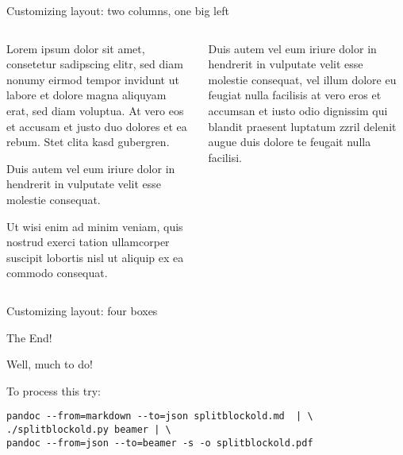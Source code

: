 \documentclass[10pt,english,ignorenonframetext,]{beamer}
\begin{document}
\begin{frame}{Customizing layout: two columns, one big left}

\vspace*{-1em}\begin{columns}[T]
	\begin{column}[t]{0.66\textwidth}

Lorem ipsum dolor sit amet, consetetur sadipscing elitr, sed diam nonumy
eirmod tempor invidunt ut labore et dolore magna aliquyam erat, sed diam
voluptua. At vero eos et accusam et justo duo dolores et ea rebum. Stet
clita kasd gubergren.

Duis autem vel eum iriure dolor in hendrerit in vulputate velit esse
molestie consequat.

Ut wisi enim ad minim veniam, quis nostrud exerci tation ullamcorper
suscipit lobortis nisl ut aliquip ex ea commodo consequat.

	\end{column}
	\begin{column}[t]{0.33\textwidth}

Duis autem vel eum iriure dolor in hendrerit in vulputate velit esse
molestie consequat, vel illum dolore eu feugiat nulla facilisis at vero
eros et accumsan et iusto odio dignissim qui blandit praesent luptatum
zzril delenit augue duis dolore te feugait nulla facilisi.

	\end{column}
\end{columns}

\end{frame}

\begin{frame}{Customizing layout: four boxes}


\end{frame}

\begin{frame}[fragile]{The End!}

Well, much to do!

To process this try:

\begin{verbatim}
pandoc --from=markdown --to=json splitblockold.md  | \
./splitblockold.py beamer | \
pandoc --from=json --to=beamer -s -o splitblockold.pdf
\end{verbatim}

\end{frame}
\end{document}
